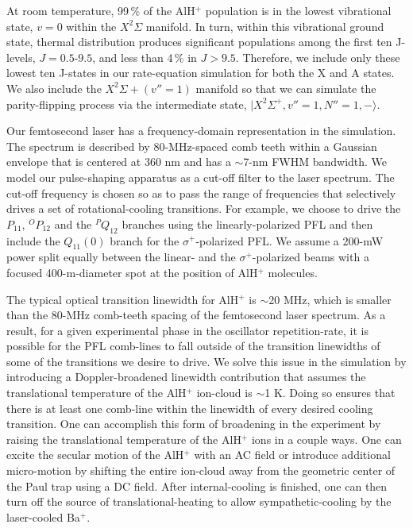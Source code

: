 \documentclass[nofootinbib,aip,jcp,reprint]{revtex4-1}
\begin{document}
At room temperature, 99$\, \%$ of the AlH$^+$ population is in the lowest vibrational state, $v=0$ within the $X^2 \Sigma$ manifold. In turn, within this vibrational ground state, thermal distribution produces significant populations among the first ten J-levels, $J=0.5$-$9.5$, and less than 4$\, \%$ in $J>9.5$. Therefore, we include only these lowest ten J-states in our rate-equation simulation for both the X and A states. We also include the $X^2\Sigma+ (v''=1)$ manifold so that we can simulate the parity-flipping process via the intermediate state, $\lvert X^2\Sigma^+, v''=1, N''=1, -\rangle$.

Our femtosecond laser has a frequency-domain representation in the simulation. The spectrum is described by 80-MHz-spaced comb teeth within a Gaussian envelope that is centered at 360 nm and has a $\sim$7-nm FWHM bandwidth. We model our pulse-shaping apparatus as a cut-off filter to the laser spectrum. The cut-off frequency is chosen so as to pass the range of frequencies that selectively drives a set of rotational-cooling transitions. For example, we choose to drive the $P_{11}$, $^OP_{12}$ and the $^PQ_{12}$ branches using the linearly-polarized PFL and then include the $Q_{11}(0)$ branch for the $\sigma^+$-polarized PFL. We assume a 200-mW power split equally between the linear- and the $\sigma^+$-polarized beams with a focused 400-{\micro}m-diameter spot at the position of AlH$^+$ molecules.

The typical optical transition linewidth for AlH$^+$ is $\sim$20 MHz, which is smaller than the 80-MHz comb-teeth spacing of the femtosecond laser spectrum. As a result, for a given experimental phase in the oscillator repetition-rate, it is possible for the PFL comb-lines to fall outside of the transition linewidths of some of the transitions we desire to drive. We solve this issue in the simulation by introducing a Doppler-broadened linewidth contribution that assumes the translational temperature of the AlH$^+$ ion-cloud is $\sim$1 K. Doing so ensures that there is at least one comb-line within the linewidth of every desired cooling transition. One can accomplish this form of broadening in the experiment by raising the translational temperature of the AlH$^+$ ions in a couple ways. One can excite the secular motion of the AlH$^+$ with an AC field or introduce additional micro-motion by shifting the entire ion-cloud away from the geometric center of the Paul trap using a DC field. After internal-cooling is finished, one can then turn off the source of translational-heating to allow sympathetic-cooling by the laser-cooled Ba$^+$.
\end{document}

